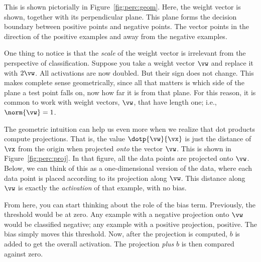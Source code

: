 \MoveNextFigure{-1cm}

This is shown pictorially in Figure~\ref{fig:perc:geom}.  Here, the
weight vector is shown, together with its perpendicular plane.  This
plane forms the decision boundary between positive points and negative
points.  The vector points in the direction of the positive examples
and away from the negative examples.

One thing to notice is that the \emph{scale} of the weight vector is
irrelevant from the perspective of classification.  Suppose you take a
weight vector $\vw$ and replace it with $2 \vw$.  All activations are
now doubled.  But their sign does not change.  This makes complete
sense geometrically, since all that matters is which side of the plane
a test point falls on, now how far it is from that plane.  For this
reason, it is common to work with 
weight vectors, $\vw$, that have length one; i.e., $\norm{\vw} = 1$.



The geometric intuition can help us even more when we realize that
dot products compute projections.  That is, the value $\dotp{\vw}{\vx}$
is just the distance of $\vx$ from the origin when projected
\emph{onto} the vector $\vw$.  This is shown in
Figure~\ref{fig:perc:proj}.  In that figure, all the data points are
projected onto $\vw$.  Below, we can think of this as a
one-dimensional version of the data, where each data point is placed
according to its projection along $\vw$.  This distance along $\vw$ is
exactly the \emph{activation} of that example, with no bias.

From here, you can start thinking about the role of the bias term.
Previously, the threshold would be at zero.  Any example with a
negative projection onto $\vw$ would be classified negative; any
example with a positive projection, positive.  The bias simply moves
this threshold.  Now, after the projection is computed, $b$ is added
to get the overall activation.  The projection \emph{plus} $b$ is then
compared against zero.


